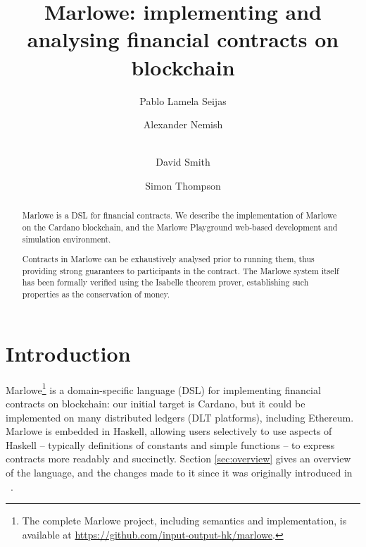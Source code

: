 \documentclass[runningheads]{llncs}
\begin{document}
%
\title{Marlowe: implementing and analysing financial contracts on blockchain}%
%
%
\author{
Pablo {Lamela Seijas} \and
Alexander Nemish \and \\
David Smith \and
Simon Thompson}%
%

%
%
\maketitle              %

\vspace{-4mm}
\begin{abstract}
Marlowe is a DSL for financial contracts. We describe the implementation of Marlowe on the Cardano blockchain, and the Marlowe Playground web-based development and simulation environment.

Contracts in Marlowe can be exhaustively analysed prior to running them, thus providing strong guarantees to participants in the contract. The Marlowe system itself has been formally verified using the Isabelle theorem prover, establishing such properties as the conservation of money.

\end{abstract}


\section{Introduction}

Marlowe\footnote{The complete Marlowe project, including semantics and implementation, is available at \url{https://github.com/input-output-hk/marlowe}.} is a domain-specific language (DSL) for implementing financial contracts on blockchain: our initial target is Cardano, but it could be implemented on many distributed ledgers (DLT platforms), including Ethereum. Marlowe is embedded in Haskell, allowing users selectively to use aspects of Haskell -- typically definitions of constants and simple functions -- to express contracts more readably and succinctly. Section \ref{sec:overview} gives an overview of the language, and the changes made to it since it was originally introduced in ~\cite{isola-marlowe}.
\end{document}

